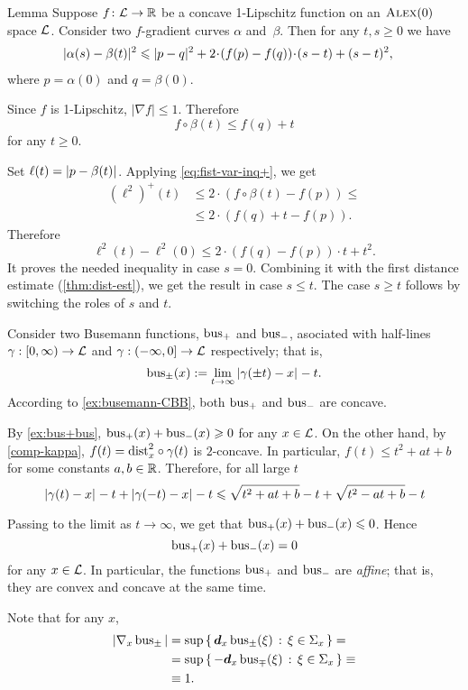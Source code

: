 \begin{thm}{Lemma}\label{lem:dist-estimate}
Suppose $f\colon\mathcal{L}\to\mathbb{R}$ be a concave 1-Lipschitz function on an $\textsc{Alex}(0)$ space $\mathcal{L}$.
Consider two $f$-gradient curves $\alpha$ and~$\beta$.
Then for any $t, s\ge 0$ we have
\begin{align*}
&\dist[2]{\alpha(s)}{\beta(t)}{}
\le 
\dist[2]{p}{q}{}+
2\cdot(f(p)-f(q))\cdot(s-t)+ (s-t)^2,
\end{align*}
where $p=\alpha(0)$ and $q=\beta(0)$.
\end{thm}

Since $f$ is 1-Lipschitz, $|\nabla f|\le1$.
Therefore 
\[f\circ\beta(t)\le f(q)+t\]
for any $t\ge0$.

Set $\ell(t)=\dist{p}{\beta(t)}{}$.
Applying \ref{eq:fist-var-inq+}, we get
\begin{align*}
(\ell^2)^+(t)
&\le 2\cdot \left(f\circ\beta(t)-f(p)\right)\le 
\\
&\le2\cdot\left(f(q)+t-f(p)\right).
\end{align*}
Therefore 
\[\ell^2(t)-\ell^2(0)\le 2\cdot\left(f(q)-f(p)\right)\cdot t + t^2.\]
It proves the needed inequality in case $s=0$.
Combining it with the first distance estimate (\ref{thm:dist-est}), we get the result in case $s\le t$.
The case $s\ge t$ follows by switching the roles of $s$ and $t$.
\qeds


 Consider two Busemann functions, $\operatorname{\rm bus}\nolimits_+$ and $\operatorname{\rm bus}\nolimits_-$, asociated with half-lines $\gamma:[0,\infty)\to \mathcal{L}$ and $\gamma:(-\infty,0]\to \mathcal{L}$ respectively; that is,
\[
\bus_\pm(x)
\df
\lim_{t\to\infty}\dist{\gamma(\pm t)}{x}{}- t.
\]
According to \ref{ex:busemann-CBB}, 
both $\operatorname{\rm bus}\nolimits_+$ and $\operatorname{\rm bus}\nolimits_-$ are concave.

By \ref{ex:bus+bus}, $\operatorname{\rm bus}\nolimits_+(x)+\operatorname{\rm bus}\nolimits_-(x)\geqslant0$ for any $x\in \mathcal{L}$.
On the other hand, by \ref{comp-kappa}, 
$f(t)=\mathrm{dist}_x^2\circ\gamma(t)$ 
is $2$-concave.
In particular, $f(t)\le t^2+at+b$ for some constants $a,b\in\mathbb{R}$.  Therefore, for all large $t$
\[
\dist{\gamma( t)}{x}{}- t +\dist{\gamma(- t)}{x}{}- t\le \sqrt{ t^2+at+b}-t+\sqrt{ t^2-at+b}-t
\]

Passing to the limit as $t\to\infty$, we get that  $\operatorname{\rm bus}\nolimits_+(x)+\operatorname{\rm bus}\nolimits_-(x)\leqslant 0$.
Hence
\[
\operatorname{\rm bus}\nolimits_+(x)+\operatorname{\rm bus}\nolimits_-(x)= 0
\]
for any $x\in \mathcal{L}$.
In particular, the functions $\operatorname{\rm bus}\nolimits_+$ and $\operatorname{\rm bus}\nolimits_-$ are \emph{affine};
that is, they are convex and concave at the same time.

Note that for any $x$,
\begin{align*}
|\nabla_x \operatorname{\rm bus}\nolimits_\pm|
&=\sup\left\{\,{\bm{d}_x\operatorname{\rm bus}\nolimits_\pm(\xi)}\,:\,{\xi\in\Sigma_x}\,\right\}=
\\
&=\sup\left\{\,{-\bm{d}_x\operatorname{\rm bus}\nolimits_\mp(\xi)}\,:\,{\xi\in\Sigma_x}\,\right\}\equiv
\\
&\equiv1.
\end{align*}

